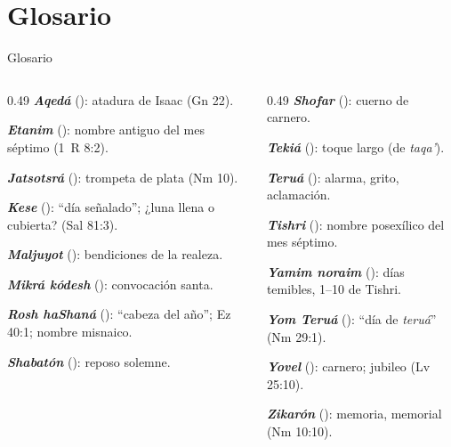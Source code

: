 \section{Glosario}

\begin{frame}{Glosario}
\scriptsize\RaggedRight
\begin{columns}[t,onlytextwidth]
\begin{column}{0.49\textwidth}
\textbf{\emph{Aqedá}} (): atadura de Isaac (Gn 22).\par
\textbf{\emph{Etanim}} (): nombre antiguo del mes séptimo (1~R 8:2).\par
\textbf{\emph{Jatsotsrá}} (): trompeta de plata (Nm 10).\par
\textbf{\emph{Kese}} (): ``día señalado''; ¿luna llena o cubierta? (Sal 81:3).\par
\textbf{\emph{Maljuyot}} (): bendiciones de la realeza.\par
\textbf{\emph{Mikrá kódesh}} (): convocación santa.\par
\textbf{\emph{Rosh haShaná}} (): ``cabeza del año''; Ez 40:1; nombre misnaico.\par
\textbf{\emph{Shabatón}} (): reposo solemne.
\end{column}
\begin{column}{0.49\textwidth}
\textbf{\emph{Shofar}} (): cuerno de carnero.\par
\textbf{\emph{Tekiá}} (): toque largo (de \emph{taqa'}).\par
\textbf{\emph{Teruá}} (): alarma, grito, aclamación.\par
\textbf{\emph{Tishri}} (): nombre posexílico del mes séptimo.\par
\textbf{\emph{Yamim noraim}} (): días temibles, 1--10 de Tishri.\par
\textbf{\emph{Yom Teruá}} (): ``día de \emph{teruá}'' (Nm 29:1).\par
\textbf{\emph{Yovel}} (): carnero; jubileo (Lv 25:10).\par
\textbf{\emph{Zikarón}} (): memoria, memorial (Nm 10:10).
\end{column}
\end{columns}
\end{frame}

